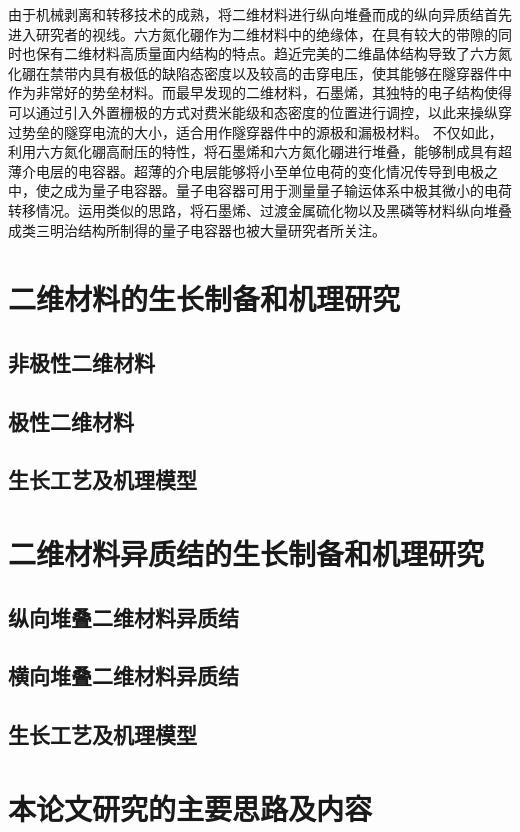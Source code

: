 由于机械剥离和转移技术的成熟，将二维材料进行纵向堆叠而成的纵向异质结首先进入研究者的视线。六方氮化硼作为二维材料中的绝缘体，在具有较大的带隙的同时也保有二维材料高质量面内结构的特点。趋近完美的二维晶体结构导致了六方氮化硼在禁带内具有极低的缺陷态密度以及较高的击穿电压，使其能够在隧穿器件中作为非常好的势垒材料。而最早发现的二维材料，石墨烯，其独特的电子结构使得可以通过引入外置栅极的方式对费米能级和态密度的位置进行调控，以此来操纵穿过势垒的隧穿电流的大小，适合用作隧穿器件中的源极和漏极材料。
不仅如此，利用六方氮化硼高耐压的特性，将石墨烯和六方氮化硼进行堆叠，能够制成具有超薄介电层的电容器。超薄的介电层能够将小至单位电荷的变化情况传导到电极之中，使之成为量子电容器。量子电容器可用于测量量子输运体系中极其微小的电荷转移情况。运用类似的思路，将石墨烯、过渡金属硫化物以及黑磷等材料纵向堆叠成类三明治结构所制得的量子电容器也被大量研究者所关注。



\section{二维材料的生长制备和机理研究}
\subsection{非极性二维材料}
\subsection{极性二维材料}
\subsection{生长工艺及机理模型}

\section{二维材料异质结的生长制备和机理研究}
\subsection{纵向堆叠二维材料异质结}
\subsection{横向堆叠二维材料异质结}
\subsection{生长工艺及机理模型}

\section{本论文研究的主要思路及内容}